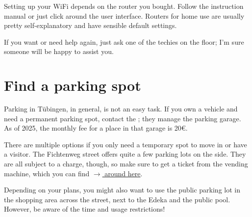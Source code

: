 Setting up your WiFi depends on the router you bought. Follow the instruction manual or just click around the user interface. Routers for home use are usually pretty self-explanatory and have sensible default settings.

If you want or need help again, just ask one of the techies on the floor; I'm sure someone will be happy to assist you.

\section{Find a parking spot}
Parking in Tübingen, in general, is not an easy task. If you own a vehicle and need a permanent parking spot, contact the ; they manage the parking garage. As of 2025, the monthly fee for a place in that garage is 20€.

There are multiple options if you only need a temporary spot to move in or have a visitor. The Fichtenweg street offers quite a few parking lots on the side. They are all subject to a charge, though, so make sure to get a ticket from the vending machine, which you can find \href{https://maps.app.goo.gl/Wi5gXiBErb9xiCWt9}{$\xrightarrow{}$ around here}.

Depending on your plans, you might also want to use the public parking lot in the shopping area across the street, next to the Edeka and the public pool. However, be aware of the time and usage restrictions!